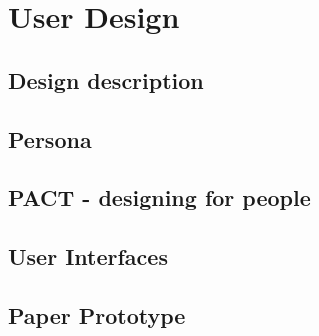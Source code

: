 \chapter{User Design} 


\section{Design description}



\section{Persona}

\section{PACT - designing for people}


\section{User Interfaces}


\section{Paper Prototype}

